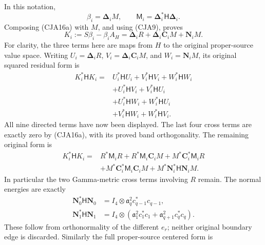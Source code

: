 \documentclass[11pt,a4paper]{article}
\begin{document}
In this notation,
\[
 \beta_i=\boldsymbol\Delta_iM,\qquad
 \mathsf M_i=\boldsymbol\Delta_i^*\mathsf H\boldsymbol\Delta_i .
\]
Composing (CJA16a) with \(M\), and using (CJA9), proves
\begin{equation}
 K_i:=S\beta_i-\beta_iA_H
 =\boldsymbol\Delta_iR+
   \boldsymbol\Delta_i\boldsymbol C_iM+\boldsymbol N_iM.
 \tag{CJA17}
\end{equation}
For clarity, the three terms here are maps from \(H\) to the original
proper-source value space.
Writing
\(U_i=\boldsymbol\Delta_iR\),
\(V_i=\boldsymbol\Delta_i\boldsymbol C_iM\), and
\(W_i=\boldsymbol N_iM\), its original squared residual form is
\begin{equation}
 \begin{split}
 K_i^*\mathsf HK_i={}&
 U_i^*\mathsf HU_i+V_i^*\mathsf HV_i+W_i^*\mathsf HW_i\\
 &+U_i^*\mathsf HV_i+V_i^*\mathsf HU_i\\
 &+U_i^*\mathsf HW_i+W_i^*\mathsf HU_i\\
 &+V_i^*\mathsf HW_i+W_i^*\mathsf HV_i .
 \end{split}
 \tag{CJA18}
\end{equation}
All nine directed terms have now been displayed.  The last four
cross terms are exactly zero by (CJA16a), with its proved band
orthogonality.  The remaining original form is
\begin{equation}
 \begin{split}
 K_i^*\mathsf HK_i={}&R^*\mathsf M_iR
  +R^*\mathsf M_i\boldsymbol C_iM
  +M^*\boldsymbol C_i^*\mathsf M_iR\\
 &+M^*\boldsymbol C_i^*\mathsf M_i\boldsymbol C_iM
  +M^*\boldsymbol N_i^*\mathsf H\boldsymbol N_iM .
 \end{split}
 \tag{CJA18a}
\end{equation}
In particular the two Gamma-metric cross terms involving \(R\)
remain.  The normal energies are exactly
\begin{equation}
 \begin{split}
 \boldsymbol N_0^*\mathsf H\boldsymbol N_0
 &=I_4\otimes\mathfrak a_q^2c_{q-1}^*c_{q-1},\\
 \boldsymbol N_1^*\mathsf H\boldsymbol N_1
 &=I_4\otimes
  (\mathfrak a_1^2c_1^*c_1+
                  \mathfrak a_{q+1}^2c_q^*c_q).
 \end{split}
 \tag{CJA18b}
\end{equation}
These follow from orthonormality of the different \(e_r\);
neither original boundary edge is discarded.
Similarly the full proper-source centered form is
\end{document}
